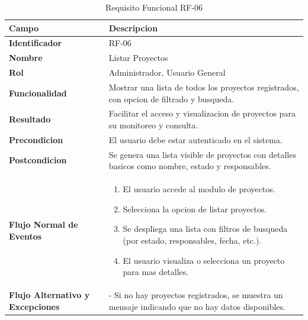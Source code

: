\begin{table}[htb!]
\centering
\caption{Requisito Funcional RF-06}
\begin{tabular}{|p{3cm}|p{12cm}|}
\hline
\textbf{Campo} & \textbf{Descripcion} \\ \hline
\textbf{Identificador} & RF-06 \\ \hline
\textbf{Nombre} & Listar Proyectos \\ \hline
\textbf{Rol} & Administrador, Usuario General \\ \hline
\textbf{Funcionalidad} & Mostrar una lista de todos los proyectos registrados, con opcion de filtrado y busqueda. \\ \hline
\textbf{Resultado} & Facilitar el acceso y visualizacion de proyectos para su monitoreo y consulta. \\ \hline
\textbf{Precondicion} & El usuario debe estar autenticado en el sistema. \\ \hline
\textbf{Postcondicion} & Se genera una lista visible de proyectos con detalles basicos como nombre, estado y responsables. \\ \hline
\textbf{Flujo Normal de Eventos} & 
\begin{enumerate}
    \item El usuario accede al modulo de proyectos. 
    \item Selecciona la opcion de listar proyectos. 
    \item Se despliega una lista con filtros de busqueda (por estado, responsables, fecha, etc.). 
    \item El usuario visualiza o selecciona un proyecto para mas detalles. 
    
\end{enumerate}
\\ \hline
\textbf{Flujo Alternativo y Excepciones} & 
- Si no hay proyectos registrados, se muestra un mensaje indicando que no hay datos disponibles. \\ \hline
\end{tabular}
\end{table}
\FloatBarrier

